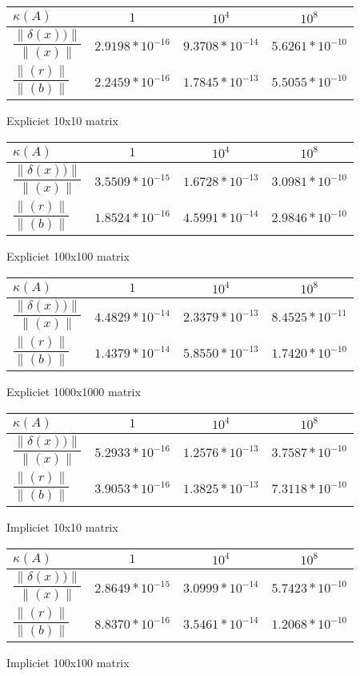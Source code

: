  

\centering
\begin{tabular}{|l|c|c|c|}
\hline
$\kappa(A)$ & $1$ & $10^4$ & $10^8$ \\ \hline
$\dfrac{\|\delta(x))\|}{\|(x)\|}  $ & $2.9198*10^{-16}$ & $9.3708*10^{-14}$ & $5.6261*10^{-10}$ \\ \hline
$\dfrac{\|(r)\|}{\|(b)\|}$ & $2.2459*10^{-16}$ & $1.7845*10^{-13}$ & $5.5055*10^{-10}$ \\ \hline
\end{tabular}
\caption{Expliciet 10x10 matrix}


\begin{tabular}{|l|c|c|c|}
\hline
$\kappa(A)$ & $1$ & $10^4$ & $10^8$ \\ \hline
$\dfrac{\|\delta(x))\|}{\|(x)\|}  $ & $3.5509*10^{-15}$ & $1.6728*10^{-13}$ & $3.0981*10^{-10}$ \\ \hline
$\dfrac{\|(r)\|}{\|(b)\|}$ & $1.8524*10^{-16}$ & $4.5991*10^{-14}$ & $2.9846*10^{-10}$ \\ \hline
\end{tabular}
\caption{Expliciet 100x100 matrix}


\begin{tabular}{|l|c|c|c|}
\hline
$\kappa(A)$ & $1$ & $10^4$ & $10^8$ \\ \hline
$\dfrac{\|\delta(x))\|}{\|(x)\|}  $ & $4.4829*10^{-14}$ & $2.3379*10^{-13}$ & $8.4525*10^{-11}$ \\ \hline
$\dfrac{\|(r)\|}{\|(b)\|}$ & $1.4379*10^{-14}$ & $5.8550*10^{-13}$ & $1.7420*10^{-10}$ \\ \hline
\end{tabular}
\caption{Expliciet 1000x1000 matrix}

\begin{tabular}{|l|c|c|c|}
\hline
$\kappa(A)$ & $1$ & $10^4$ & $10^8$ \\ \hline
$\dfrac{\|\delta(x))\|}{\|(x)\|}  $ & $5.2933*10^{-16}$ & $1.2576*10^{-13}$ & $3.7587*10^{-10}$ \\ \hline
$\dfrac{\|(r)\|}{\|(b)\|}$ & $3.9053*10^{-16}$ & $1.3825*10^{-13}$ & $7.3118*10^{-10}$ \\ \hline
\end{tabular}
\caption{Impliciet 10x10 matrix}

\begin{tabular}{|l|c|c|c|}
\hline
$\kappa(A)$ & $1$ & $10^4$ & $10^8$ \\ \hline
$\dfrac{\|\delta(x))\|}{\|(x)\|}  $ & $2.8649*10^{-15}$ & $3.0999*10^{-14}$ & $5.7423*10^{-10}$ \\ \hline
$\dfrac{\|(r)\|}{\|(b)\|}$ & $8.8370*10^{-16}$ & $3.5461*10^{-14}$ & $1.2068*10^{-10}$ \\ \hline
\end{tabular}
\caption{Impliciet 100x100 matrix}

